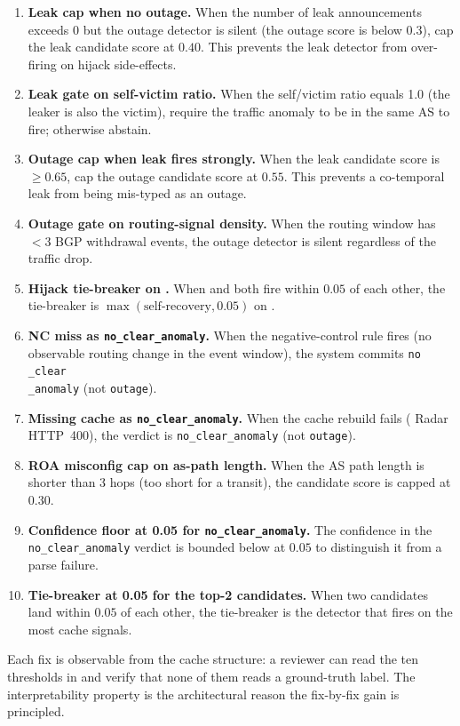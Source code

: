 \documentclass[sigcomm,nonatbib]{acmart}
\begin{document}
\begin{enumerate}
\item \textbf{Leak cap when no outage.} When
the number of leak announcements exceeds 0 but the outage detector is silent
(the outage score is below 0.3), cap the leak candidate
score at $0.40$. This prevents the leak detector
from over-firing on hijack side-effects.
\item \textbf{Leak gate on self-victim ratio.} When
the self/victim ratio equals 1.0 (the leaker
is also the victim), require the traffic anomaly
to be in the same AS to fire;
otherwise abstain.
\item \textbf{Outage cap when leak fires strongly.}
When the leak candidate score is $\geq 0.65$, cap the outage candidate
score at $0.55$. This prevents a co-temporal leak
from being mis-typed as an outage.
\item \textbf{Outage gate on routing-signal density.}
When the routing window has $< 3$ BGP withdrawal
events, the outage detector is silent regardless
of the traffic drop.
\item \textbf{Hijack tie-breaker on
.} When and
 both fire within $0.05$ of each other,
the tie-breaker is $\max(\text{self-recovery}, 0.05)$
on .
\item \textbf{NC miss as \texttt{no\_clear\_anomaly}.}
When the negative-control rule fires
(no observable routing change in the event window),
the system commits \texttt{no\\_clear\\_anomaly} (not \texttt{outage}).
\item \textbf{Missing cache as \texttt{no\_clear\_anomaly}.}
When the cache rebuild fails
(\cf{} Radar HTTP~400), the verdict is
\texttt{no_clear_anomaly} (not \texttt{outage}).
\item \textbf{ROA misconfig cap on as-path length.}
When the AS path length is shorter than 3 hops (too short for a
transit), the candidate score
is capped at $0.30$.
\item \textbf{Confidence floor at 0.05 for
\texttt{no\_clear\_anomaly}.} The confidence in
the \texttt{no_clear_anomaly} verdict is bounded
below at $0.05$ to distinguish it from a parse
failure.
\item \textbf{Tie-breaker at 0.05 for the
top-2 candidates.} When two candidates land within
$0.05$ of each other, the tie-breaker is the
detector that fires on the most cache signals.
\end{enumerate}

Each fix is observable from the cache structure: a
reviewer can read the ten thresholds in
 and verify that none of
them reads a ground-truth label. The interpretability
property is the architectural reason the fix-by-fix
gain is principled.
\end{document}
